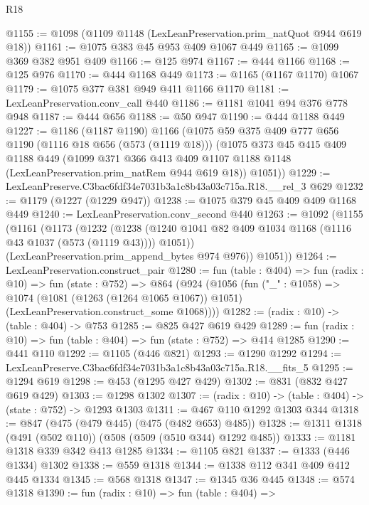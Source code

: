 \begin{lexlean}{R18}
\begin{coremodule}
@1155 := @1098 (@1109 @1148 (LexLeanPreservation.prim_natQuot @944 @619 @18))
@1161 := @1075 @383 @45 @953 @409 @1067 @449
@1165 := @1099 @369 @382 @951 @409
@1166 := @125 @974
@1167 := @444 @1166
@1168 := @125 @976
@1170 := @444 @1168 @449
@1173 := @1165 (@1167 @1170) @1067
@1179 := @1075 @377 @381 @949 @411 @1166 @1170
@1181 := LexLeanPreservation.conv_call @440
@1186 := @1181 @1041 @94 @376 @778 @948
@1187 := @444 @656
@1188 := @50 @947
@1190 := @444 @1188 @449
@1227 := @1186
    (@1187 @1190)
    @1166
    (@1075
      @59
      @375
      @409
      @777
      @656
      @1190
      (@1116 @18 @656 (@573 (@1119 @18)))
      (@1075
        @373
        @45
        @415
        @409
        @1188
        @449
        (@1099
          @371
          @366
          @413
          @409
          @1107
          @1188
          @1148
          (LexLeanPreservation.prim_natRem @944 @619 @18))
        @1051))
@1229 := LexLeanPreserve.C3bac6fdf34e7031b3a1c8b43a03c715a.R18.__rel_3 @629
@1232 := @1179 (@1227 (@1229 @947))
@1238 := @1075 @379 @45 @409 @409 @1168 @449
@1240 := LexLeanPreservation.conv_second @440
@1263 := @1092
    (@1155
      (@1161
        (@1173
          (@1232
            (@1238 (@1240 @1041 @82 @409 @1034 @1168 (@1116 @43 @1037 (@573 (@1119 @43)))) @1051))
          (LexLeanPreservation.prim_append_bytes @974 @976))
        @1051))
@1264 := LexLeanPreservation.construct_pair
@1280 := fun (table : @404) =>
  fun (radix : @10) =>
  fun (state : @752) =>
  @864
    (@924
      (@1056
        (fun ("_" : @1058) =>
        @1074
          (@1081 (@1263 (@1264 @1065 @1067)) @1051)
          (LexLeanPreservation.construct_some @1068))))
@1282 := (radix : @10) -> (table : @404) -> @753
@1285 := @825 @427 @619 @429
@1289 := fun (radix : @10) => fun (table : @404) => fun (state : @752) => @414 @1285
@1290 := @441 @110
@1292 := @1105 (@446 @821)
@1293 := @1290 @1292
@1294 := LexLeanPreserve.C3bac6fdf34e7031b3a1c8b43a03c715a.R18.__fits_5
@1295 := @1294 @619
@1298 := @453 (@1295 @427 @429)
@1302 := @831 (@832 @427 @619 @429)
@1303 := @1298 @1302
@1307 := (radix : @10) -> (table : @404) -> (state : @752) -> @1293 @1303
@1311 := @467 @110 @1292 @1303 @344
@1318 := @847 (@475 (@479 @445) (@475 (@482 @653) @485))
@1328 := @1311 @1318 (@491 (@502 @110)) (@508 (@509 (@510 @344) @1292 @485))
@1333 := @1181 @1318 @339 @342 @413 @1285
@1334 := @1105 @821
@1337 := @1333 (@446 @1334) @1302
@1338 := @559 @1318
@1344 := @1338 @112 @341 @409 @412 @445 @1334
@1345 := @568 @1318
@1347 := @1345 @36 @445
@1348 := @574 @1318
@1390 := fun (radix : @10) =>
  fun (table : @404) =>

\end{coremodule}
\end{lexlean}
